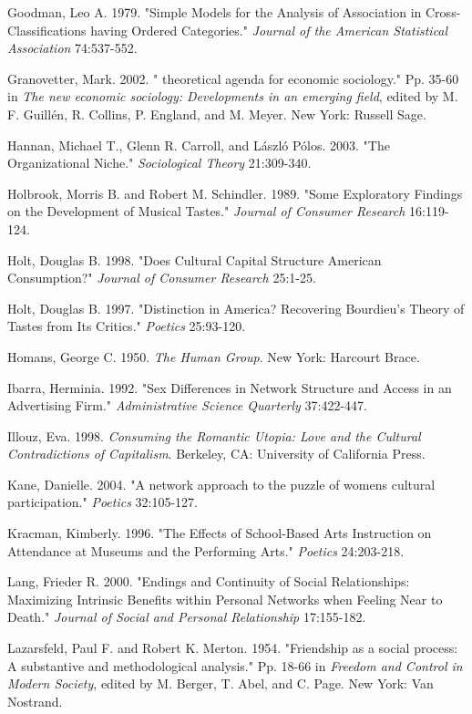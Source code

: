 \documentclass[
]{article}
\begin{document}
Goodman, Leo A. 1979. "Simple Models for the Analysis of Association in Cross-Classifications having Ordered Categories." \emph{Journal of the American Statistical Association} 74:537-552.

Granovetter, Mark. 2002. " theoretical agenda for economic sociology." Pp. 35-60 in \emph{The new economic sociology: Developments in an emerging field}, edited by M. F. Guillén, R. Collins, P. England, and M. Meyer. New York: Russell Sage.

Hannan, Michael T., Glenn R. Carroll, and László Pólos. 2003. "The Organizational Niche." \emph{Sociological Theory} 21:309-340.

Holbrook, Morris B. and Robert M. Schindler. 1989. "Some Exploratory Findings on the Development of Musical Tastes." \emph{Journal of Consumer Research} 16:119-124.

Holt, Douglas B. 1998. "Does Cultural Capital Structure American Consumption?" \emph{Journal of Consumer Research} 25:1-25.

Holt, Douglas B. 1997. "Distinction in America? Recovering Bourdieu's Theory of Tastes from Its Critics." \emph{Poetics} 25:93-120.

Homans, George C. 1950. \emph{The Human Group}. New York: Harcourt Brace.

Ibarra, Herminia. 1992. "Sex Differences in Network Structure and Access in an Advertising Firm." \emph{Administrative Science Quarterly} 37:422-447.

Illouz, Eva. 1998. \emph{Consuming the Romantic Utopia: Love and the Cultural Contradictions of Capitalism}. Berkeley, CA: University of California Press.

Kane, Danielle. 2004. "A network approach to the puzzle of women\textquotesingle s cultural participation." \emph{Poetics} 32:105-127.

Kracman, Kimberly. 1996. "The Effects of School-Based Arts Instruction on Attendance at Museums and the Performing Arts." \emph{Poetics} 24:203-218.

Lang, Frieder R. 2000. "Endings and Continuity of Social Relationships: Maximizing Intrinsic Benefits within Personal Networks when Feeling Near to Death." \emph{Journal of Social and Personal Relationship} 17:155-182.

Lazarsfeld, Paul F. and Robert K. Merton. 1954. "Friendship as a social process: A substantive and methodological analysis." Pp. 18-66 in \emph{Freedom and Control in Modern Society}, edited by M. Berger, T. Abel, and C. Page. New York: Van Nostrand.
\end{document}

